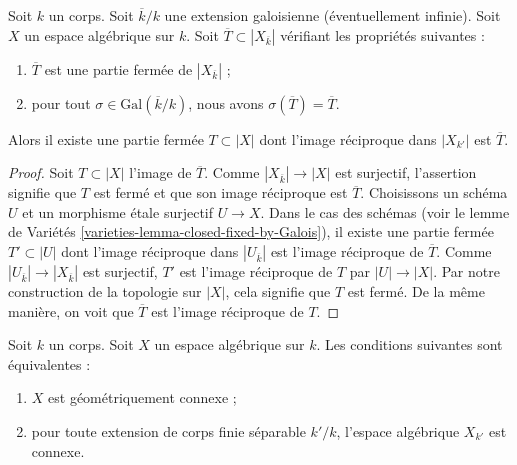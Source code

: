 \begin{lemma}
\label{lemma-closed-fixed-by-Galois}
Soit $k$ un corps. Soit $\overline{k}/k$ une extension galoisienne
(éventuellement infinie). Soit $X$ un espace algébrique sur $k$. Soit
$\overline{T} \subset |X_{\overline{k}}|$ vérifiant les propriétés suivantes :
\begin{enumerate}
\item $\overline{T}$ est une partie fermée de $|X_{\overline{k}}|$ ;
\item pour tout $\sigma \in \text{Gal}(\overline{k}/k)$,
nous avons $\sigma(\overline{T}) = \overline{T}$.
\end{enumerate}
Alors il existe une partie fermée $T \subset |X|$ dont l'image réciproque
dans $|X_{k'}|$ est $\overline{T}$.
\end{lemma}

\begin{proof}
Soit $T \subset |X|$ l'image de $\overline{T}$.
Comme $|X_{\overline{k}}| \to |X|$ est surjectif, l'assertion signifie
que $T$ est fermé et que son image réciproque est $\overline{T}$.
Choisissons un schéma $U$ et un morphisme \'etale surjectif $U \to X$.
Dans le cas des schémas
(voir le lemme de Variétés \ref{varieties-lemma-closed-fixed-by-Galois}),
il existe une partie fermée $T' \subset |U|$ dont l'image réciproque
dans $|U_{\overline{k}}|$ est l'image réciproque de $\overline{T}$.
Comme $|U_{\overline{k}}| \to |X_{\overline{k}}|$ est surjectif,
$T'$ est l'image réciproque de $T$ par $|U| \to |X|$.
Par notre construction de la topologie sur $|X|$, cela signifie que $T$ est
fermé. De la même manière, on voit que $\overline{T}$ est l'image
réciproque de $T$.
\end{proof}

\begin{lemma}
\label{lemma-characterize-geometrically-disconnected}
Soit $k$ un corps. Soit $X$ un espace algébrique sur $k$.
Les conditions suivantes sont équivalentes :
\begin{enumerate}
\item $X$ est géométriquement connexe ;
\item pour toute extension de corps finie séparable $k'/k$,
l'espace algébrique $X_{k'}$ est connexe.
\end{enumerate}
\end{lemma}

